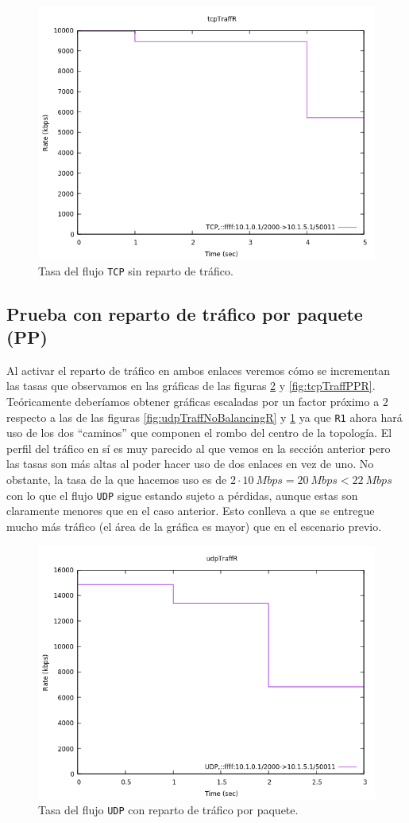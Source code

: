 \documentclass[11pt]{article}
\begin{document}
            \begin{figure}
                \centering
                \includegraphics[width=0.6\linewidth]{tcpTraffNoBalancingR.png}
                \caption{Tasa del flujo \texttt{TCP} sin reparto de tráfico.}
                \label{fig:tcpTraffNoBalancingR}
            \end{figure}

        \subsection{Prueba con reparto de tráfico por paquete (PP)}
            Al activar el reparto de tráfico en ambos enlaces veremos cómo se incrementan las tasas que observamos en las gráficas de las figuras \ref{fig:udpTraffPPR} y \ref{fig:tcpTraffPPR}. Teóricamente deberíamos obtener gráficas escaladas por un factor próximo a $2$ respecto a las de las figuras \ref{fig:udpTraffNoBalancingR} y \ref{fig:tcpTraffNoBalancingR} ya que \texttt{R1} ahora hará uso de los dos ``caminos'' que componen el rombo del centro de la topología. El perfil del tráfico en sí es muy parecido al que vemos en la sección anterior pero las tasas son más altas al poder hacer uso de dos enlaces en vez de uno. No obstante, la tasa de la que hacemos uso es de $2 \cdot 10\ Mbps = 20\ Mbps < 22\ Mbps$ con lo que el flujo \texttt{UDP} sigue estando sujeto a pérdidas, aunque estas son claramente menores que en el caso anterior. Esto conlleva a que se entregue mucho más tráfico (el área de la gráfica es mayor) que en el escenario previo.

            \begin{figure}
                \centering
                \includegraphics[width=0.6\linewidth]{udpTraffPPR.png}
                \caption{Tasa del flujo \texttt{UDP} con reparto de tráfico por paquete.}
                \label{fig:udpTraffPPR}
            \end{figure}
\end{document}
